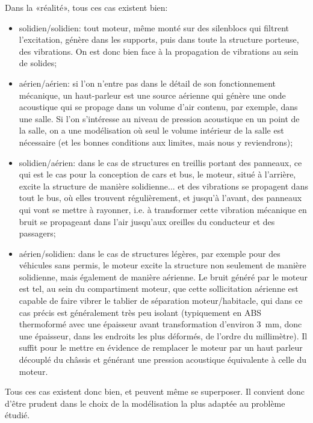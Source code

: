 \medskip
Dans la «réalité», tous ces cas existent bien:
\begin{itemize}
  \item solidien/solidien: tout moteur, même monté sur des silenblocs qui filtrent l'excitation, génère dans les supports, puis dans toute la structure porteuse, des vibrations. On est donc bien face à la propagation de vibrations au sein de solides;
  \item aérien/aérien: si l'on n'entre pas dans le détail de son fonctionnement mécanique, un haut-parleur est une source aérienne qui génère une onde acoustique qui se propage dans un volume d'air contenu, par exemple, dans une salle. Si l'on s'intéresse au niveau de pression acoustique en un point de la salle, on a une modélisation où seul le volume intérieur de la salle est nécessaire (et les bonnes conditions aux limites, mais nous y reviendrons);
    \item solidien/aérien: dans le cas de structures en treillis portant des panneaux, ce qui est le cas pour la conception de cars et bus, le moteur, situé à l'arrière, excite la structure de manière solidienne... et des vibrations se propagent dans tout le bus, où elles trouvent régulièrement, et jusqu'à l'avant, des panneaux qui vont se mettre à rayonner, i.e. à transformer cette vibration mécanique en bruit se propageant dans l'air jusqu'aux oreilles du conducteur et des passagers;
  \item aérien/solidien: dans le cas de structures légères, par exemple pour des véhicules sans permis, le moteur excite la structure non seulement de manière solidienne, mais également de manière aérienne. Le bruit généré par le moteur est tel, au sein du compartiment moteur, que cette sollicitation aérienne est capable de faire vibrer le tablier de séparation moteur/habitacle, qui dans ce cas précis est généralement très peu isolant (typiquement en ABS thermoformé avec une épaisseur avant transformation d'environ 3~mm, donc une épaisseur, dans les endroits les plus déformés, de l'ordre du millimètre). Il suffit pour le mettre en évidence de remplacer le moteur par un haut parleur découplé du châssis et générant une pression acoustique équivalente à celle du moteur.  
\end{itemize}
Tous ces cas existent donc bien, et peuvent même se superposer. Il convient donc d'être prudent dans le choix de la modélisation la plus adaptée au problème étudié.

\medskip
